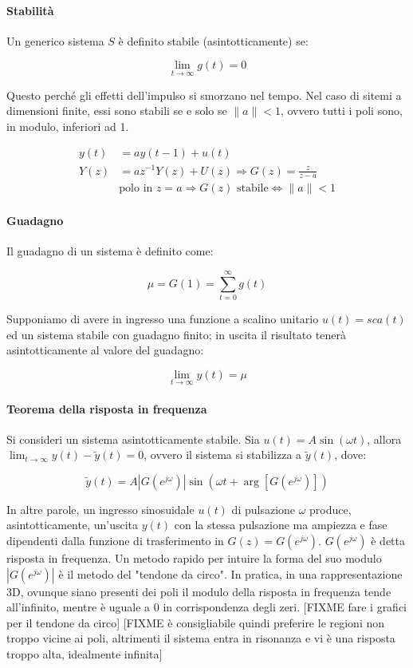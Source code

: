 \paragraph{Stabilità} Un generico sistema $S$ è definito stabile (asintotticamente) se:
  
  \[ \lim_{t\rightarrow\infty}{g(t)}=0 \]

Questo perché gli effetti dell'impulso si smorzano nel tempo. Nel caso di sitemi a dimensioni finite, essi sono stabili se e solo se $\|a\|<1$, ovvero tutti i poli sono, in modulo, inferiori ad 1.

\begin{esempio}
  \begin{align*}
    y(t)&=ay(t-1)+u(t)\\
    Y(z)&=az^{-1}Y(z)+U(z) \Longrightarrow G(z)=\frac{z}{z-a}\\
    &\text{polo in }z=a \Longrightarrow G(z) \text{ stabile} \Leftrightarrow \|a\|<1
  \end{align*}
\end{esempio}

\paragraph{Guadagno} Il guadagno di un sistema è definito come:
  
  \[ \mu=G(1)=\sum_{t=0}^{\infty}g(t) \]
  
Supponiamo di avere in ingresso una funzione a scalino unitario $u(t)=sca(t)$ ed un sistema stabile con guadagno finito; in uscita il risultato tenerà asintotticamente al valore del guadagno:

  \[ \lim_{t\rightarrow\infty}{y(t)}=\mu \]

\paragraph{Teorema della risposta in frequenza} Si consideri un sistema asintotticamente stabile. Sia $u(t)=A\sin(\omega t)$, allora $\lim_{t\rightarrow\infty}{y(t)-\tilde{y}(t)}=0$, ovvero il sistema si stabilizza a $\tilde{y}(t)$, dove:

  \[ \tilde{y}(t)=A|G(e^{j\omega})|\sin(\omega t + \arg[G(e^{j\omega})]) \]
  
In altre parole, un ingresso sinosuidale $u(t)$ di pulsazione $\omega$ produce, asintotticamente, un'uscita $y(t)$ con la stessa pulsazione ma ampiezza e fase dipendenti dalla funzione di trasferimento in $G(z)=G(e^{j\omega})$. $G(e^{j\omega})$ è detta risposta in frequenza. Un metodo rapido per intuire la forma del suo modulo $|G(e^{j\omega})|$ è il metodo del "tendone da circo". In pratica, in una rappresentazione 3D, ovunque siano presenti dei poli il modulo della risposta in frequenza tende all'infinito, mentre è uguale a 0 in corrispondenza degli zeri. 
[FIXME fare i grafici per il tendone da circo]
[FIXME è consigliabile quindi preferire le regioni non troppo vicine ai poli, altrimenti il sistema entra in risonanza e vi è una risposta troppo alta, idealmente infinita]
